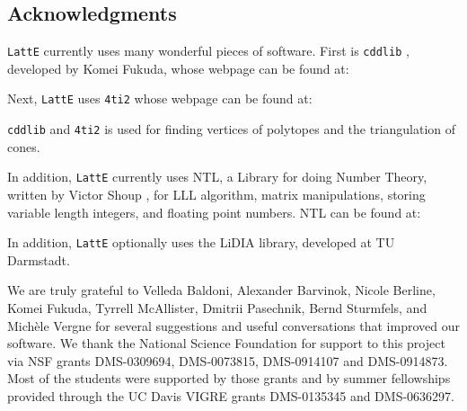 \documentclass{article}
\newcommand{\latte}{{\tt LattE}\xspace}
\newcommand{\fourtitwo}{{\tt 4ti2}\xspace}
\begin{document}
\subsection{Acknowledgments}

\par {\tt LattE} currently uses many wonderful pieces of software.
First is {\tt cddlib} \cite{fukuda}, developed by Komei Fukuda, whose webpage can be
found at:


Next, \latte uses \fourtitwo \cite{4ti2} whose webpage can be found at:


{\tt cddlib} and \fourtitwo is used for finding vertices of polytopes and the
triangulation of cones.

In addition, {\tt LattE} currently uses NTL, a
Library for doing Number Theory, written by Victor Shoup \cite{shoup},
for LLL algorithm, matrix manipulations, storing variable length
integers, and floating point numbers.  NTL can be found at:


In addition, {\tt LattE} optionally uses the LiDIA library, 
developed at TU Darmstadt.

We are truly grateful to Velleda Baldoni, Alexander Barvinok, Nicole Berline,
Komei Fukuda, Tyrrell McAllister, Dmitrii Pasechnik, Bernd Sturmfels, and
Mich\`ele Vergne for several suggestions and 
useful conversations that improved our software.  We thank the National
Science Foundation for support to this project via NSF grants DMS-0309694, 
DMS-0073815, DMS-0914107 and DMS-0914873. Most of the students were supported by those
grants and by summer fellowships provided through the UC Davis VIGRE grants
DMS-0135345 and DMS-0636297.


\clearpage

\providecommand\ISBN{ISBN }





\clearpage

\appendix
\footnotesize
\end{document}
